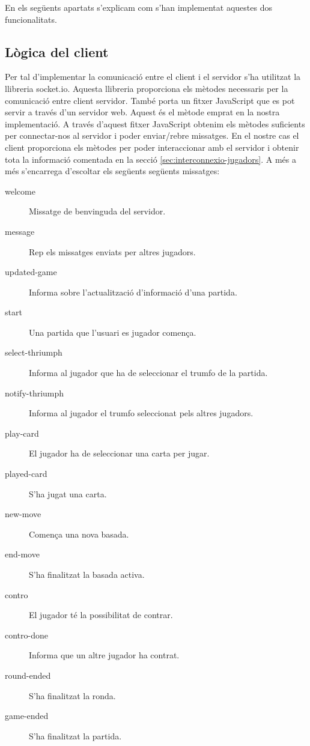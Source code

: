 En els següents apartats s'explicam com s'han implementat aquestes dos funcionalitats. 

\subsection{Lògica del client}

Per tal d'implementar la comunicació entre el client i el servidor s'ha utilitzat la llibreria socket.io. Aquesta llibreria proporciona els mètodes necessaris per la comunicació entre client servidor. També porta un fitxer JavaScript que es pot servir a través d'un servidor web. Aquest és el mètode emprat en la nostra implementació. A través d'aquest fitxer JavaScript obtenim els mètodes suficients per connectar-nos al servidor i poder enviar/rebre missatges. En el nostre cas el client proporciona els mètodes per poder interaccionar amb el servidor i obtenir tota la informació comentada en la secció \ref{sec:interconnexio-jugadors}. A més a més s'encarrega d'escoltar els següents següents missatges: 

\begin{description}
\item[welcome]{Missatge de benvinguda del servidor.}
\item[message]{Rep els missatges enviats per altres jugadors.}
\item[updated-game]{Informa sobre l'actualització d'informació d'una partida. }
\item[start]{Una partida que l'usuari es jugador comença.}
\item[select-thriumph]{Informa al jugador que ha de seleccionar el trumfo de la partida. }
\item[notify-thriumph]{Informa al jugador el trumfo seleccionat pels altres jugadors.}
\item[play-card]{El jugador ha de seleccionar una carta per jugar. }
\item[played-card]{S'ha jugat una carta.}
\item[new-move]{Comença una nova basada.}
\item[end-move]{S'ha finalitzat la basada activa.}
\item[contro]{El jugador té la possibilitat de contrar.}
\item[contro-done]{Informa que un altre jugador ha contrat.}
\item[round-ended]{S'ha finalitzat la ronda.}
\item[game-ended]{S'ha finalitzat la partida.}
\end{description}

